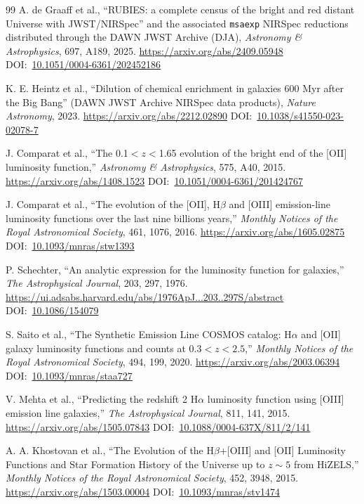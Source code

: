\documentclass[10pt,onecolumn]{article}
\newcommand{\doi}[1]{DOI:~\href{https://doi.org/#1}{#1}}
\begin{document}
\begin{thebibliography}{99}
A. de Graaff et al.,
``RUBIES: a complete census of the bright and red distant Universe with JWST/NIRSpec'' and the associated \texttt{msaexp} NIRSpec reductions distributed through the DAWN JWST Archive (DJA),
\emph{Astronomy \& Astrophysics}, 697, A189, 2025.
\url{https://arxiv.org/abs/2409.05948}
\doi{10.1051/0004-6361/202452186}

K. E. Heintz et al.,
``Dilution of chemical enrichment in galaxies 600 Myr after the Big Bang'' (DAWN JWST Archive NIRSpec data products),
\emph{Nature Astronomy}, 2023.
\url{https://arxiv.org/abs/2212.02890}
\doi{10.1038/s41550-023-02078-7}

J. Comparat et al.,
``The 0.1$<z<$1.65 evolution of the bright end of the [OII] luminosity function,''
\emph{Astronomy \& Astrophysics}, 575, A40, 2015.
\url{https://arxiv.org/abs/1408.1523}
\doi{10.1051/0004-6361/201424767}

J. Comparat et al.,
``The evolution of the [OII], H$\beta$ and [OIII] emission-line luminosity functions over the last nine billions years,''
\emph{Monthly Notices of the Royal Astronomical Society}, 461, 1076, 2016.
\url{https://arxiv.org/abs/1605.02875}
\doi{10.1093/mnras/stw1393}

P. Schechter,
``An analytic expression for the luminosity function for galaxies,''
\emph{The Astrophysical Journal}, 203, 297, 1976.
\url{https://ui.adsabs.harvard.edu/abs/1976ApJ...203..297S/abstract}
\doi{10.1086/154079}

S. Saito et al.,
``The Synthetic Emission Line COSMOS catalog: H$\alpha$ and [OII] galaxy luminosity functions and counts at $0.3<z<2.5$,''
\emph{Monthly Notices of the Royal Astronomical Society}, 494, 199, 2020.
\url{https://arxiv.org/abs/2003.06394}
\doi{10.1093/mnras/staa727}

V. Mehta et al.,
``Predicting the redshift 2 H$\alpha$ luminosity function using [OIII] emission line galaxies,''
\emph{The Astrophysical Journal}, 811, 141, 2015.
\url{https://arxiv.org/abs/1505.07843}
\doi{10.1088/0004-637X/811/2/141}

A. A. Khostovan et al.,
``The Evolution of the H$\beta$+[OIII] and [OII] Luminosity Functions and Star Formation History of the Universe up to $z\sim5$ from HiZELS,''
\emph{Monthly Notices of the Royal Astronomical Society}, 452, 3948, 2015.
\url{https://arxiv.org/abs/1503.00004}
\doi{10.1093/mnras/stv1474}


\end{thebibliography}
\end{document}
